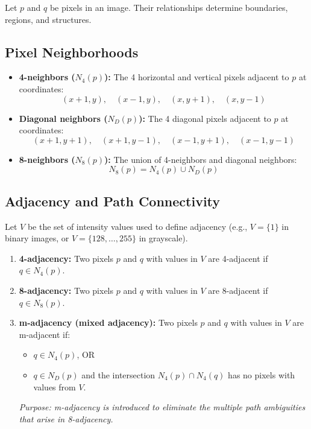 \documentclass[12pt,a4paper]{article}
\begin{document}
Let $p$ and $q$ be pixels in an image. Their relationships determine boundaries, regions, and structures.

\subsection{Pixel Neighborhoods}
\begin{itemize}[leftmargin=*, itemsep=3.5pt]
  \item \textbf{4-neighbors ($N_4(p)$):} The 4 horizontal and vertical pixels adjacent to $p$ at coordinates:
    \begin{equation}
      (x+1, y), \quad (x-1, y), \quad (x, y+1), \quad (x, y-1)
    \end{equation}
  \item \textbf{Diagonal neighbors ($N_D(p)$):} The 4 diagonal pixels adjacent to $p$ at coordinates:
    \begin{equation}
      (x+1, y+1), \quad (x+1, y-1), \quad (x-1, y+1), \quad (x-1, y-1)
    \end{equation}
  \item \textbf{8-neighbors ($N_8(p)$):} The union of 4-neighbors and diagonal neighbors:
    \begin{equation}
      N_8(p) = N_4(p) \cup N_D(p)
    \end{equation}
\end{itemize}

\subsection{Adjacency and Path Connectivity}
Let $V$ be the set of intensity values used to define adjacency (e.g., $V = \{1\}$ in binary images, or $V = \{128, \dots, 255\}$ in grayscale).
\begin{enumerate}[leftmargin=*, itemsep=3.5pt]
  \item \textbf{4-adjacency:} Two pixels $p$ and $q$ with values in $V$ are 4-adjacent if $q \in N_4(p)$.
  \item \textbf{8-adjacency:} Two pixels $p$ and $q$ with values in $V$ are 8-adjacent if $q \in N_8(p)$.
  \item \textbf{m-adjacency (mixed adjacency):} Two pixels $p$ and $q$ with values in $V$ are m-adjacent if:
    \begin{itemize}[leftmargin=1.5em, itemsep=1pt]
      \item $q \in N_4(p)$, OR
      \item $q \in N_D(p)$ and the intersection $N_4(p) \cap N_4(q)$ has no pixels with values from $V$.
    \end{itemize}
    \textit{Purpose: m-adjacency is introduced to eliminate the multiple path ambiguities that arise in 8-adjacency.}
\end{enumerate}
\end{document}
